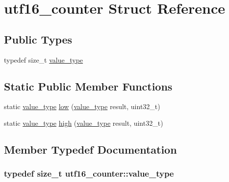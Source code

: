 \hypertarget{structutf16__counter}{\section{utf16\-\_\-counter Struct Reference}
\label{structutf16__counter}
}
\subsection*{Public Types}
\begin{DoxyCompactItemize}
\item 
typedef size\-\_\-t \hyperlink{structutf16__counter_a0d63f9ca809d182b2f184ef93bd11107}{value\-\_\-type}
\end{DoxyCompactItemize}
\subsection*{Static Public Member Functions}
\begin{DoxyCompactItemize}
\item 
static \hyperlink{structutf16__counter_a0d63f9ca809d182b2f184ef93bd11107}{value\-\_\-type} \hyperlink{structutf16__counter_a4571f3d0fbf0ce763904ec3321dcb41e}{low} (\hyperlink{structutf16__counter_a0d63f9ca809d182b2f184ef93bd11107}{value\-\_\-type} result, uint32\-\_\-t)
\item 
static \hyperlink{structutf16__counter_a0d63f9ca809d182b2f184ef93bd11107}{value\-\_\-type} \hyperlink{structutf16__counter_ac1a8793996e57dc28fd22f3165628e4d}{high} (\hyperlink{structutf16__counter_a0d63f9ca809d182b2f184ef93bd11107}{value\-\_\-type} result, uint32\-\_\-t)
\end{DoxyCompactItemize}


\subsection{Member Typedef Documentation}
\hypertarget{structutf16__counter_a0d63f9ca809d182b2f184ef93bd11107}{
\subsubsection[{value\-\_\-type}]{\setlength{\rightskip}{0pt plus 5cm}typedef size\-\_\-t {\bf utf16\-\_\-counter\-::value\-\_\-type}}}\label{structutf16__counter_a0d63f9ca809d182b2f184ef93bd11107}


